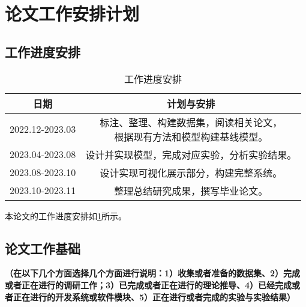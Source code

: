 \section{论文工作安排计划}

\subsection{工作进度安排}

\begin{table}[h]
    \centering
    \begin{tabular}{|c|c|}
        \hline
        \textbf{日期}   & \textbf{计划与安排}                                 \\
        \hline
        2022.12-2023.03 & \makecell[c]{标注、整理、构建数据集，阅读相关论文， \\根据现有方法和模型构建基线模型。}\\
        \hline
        2023.04-2023.08 & 设计并实现模型，完成对应实验，分析实验结果。        \\
        \hline
        2023.08-2023.10 & 设计实现可视化展示部分，构建完整系统。              \\
        \hline
        2023.10-2023.11 & 整理总结研究成果，撰写毕业论文。                    \\
        \hline
    \end{tabular}
    \caption{工作进度安排}
    \label{plan1}
\end{table}

本论文的工作进度安排如\cref{plan1}所示。
\subsection{论文工作基础}
\textbf{\color{red}（在以下几个方面选择几个方面进行说明：1）收集或者准备的数据集、2）完成或者正在进行的调研工作；3）已完成或者正在进行的理论推导、4）已经完成或者正在进行的开发系统或软件模块、5）正在进行或者完成的实验与实验结果）}

